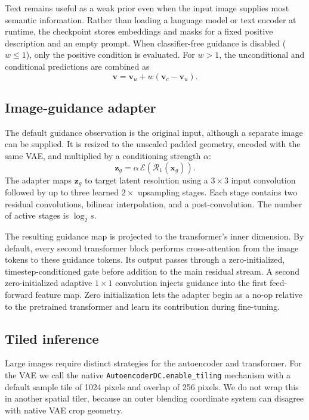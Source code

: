 \documentclass[10pt]{article}
\begin{document}
Text remains useful as a weak prior even when the input image supplies most
semantic information. Rather than loading a language model or text encoder at
runtime, the checkpoint stores embeddings and masks for a fixed positive
description and an empty prompt. When classifier-free guidance is disabled
($w\leq 1$), only the positive condition is evaluated. For $w>1$, the
unconditional and conditional predictions are combined as
\begin{equation}
  \bm{v} = \bm{v}_{u} + w(\bm{v}_{c}-\bm{v}_{u}).
\end{equation}

\subsection{Image-guidance adapter}
\label{sec:adapter}

The default guidance observation is the original input, although a separate
image can be supplied. It is resized to the unscaled padded geometry, encoded
with the same VAE, and multiplied by a conditioning strength $\alpha$:
\begin{equation}
  \bm{z}_{g} = \alpha\,
  \mathcal{E}\!\left(\mathcal{R}_{1}(\bm{x}_{g})\right).
\end{equation}
The adapter maps $\bm{z}_{g}$ to target latent resolution using a $3\times3$
input convolution followed by up to three learned $2\times$ upsampling stages.
Each stage contains two residual convolutions, bilinear interpolation, and a
post-convolution. The number of active stages is $\log_2 s$.

The resulting guidance map is projected to the transformer's inner dimension.
By default, every second transformer block performs cross-attention from the
image tokens to these guidance tokens. Its output passes through a
zero-initialized, timestep-conditioned gate before addition to the main
residual stream. A second zero-initialized adaptive $1\times1$ convolution
injects guidance into the first feed-forward feature map. Zero initialization
lets the adapter begin as a no-op relative to the pretrained transformer and
learn its contribution during fine-tuning.

\subsection{Tiled inference}
\label{sec:tiling}

Large images require distinct strategies for the autoencoder and transformer.
For the VAE we call the native \texttt{AutoencoderDC.enable\_tiling} mechanism
with a default sample tile of 1024 pixels and overlap of 256 pixels. We do not
wrap this in another spatial tiler, because an outer blending coordinate system
can disagree with native VAE crop geometry.
\end{document}
